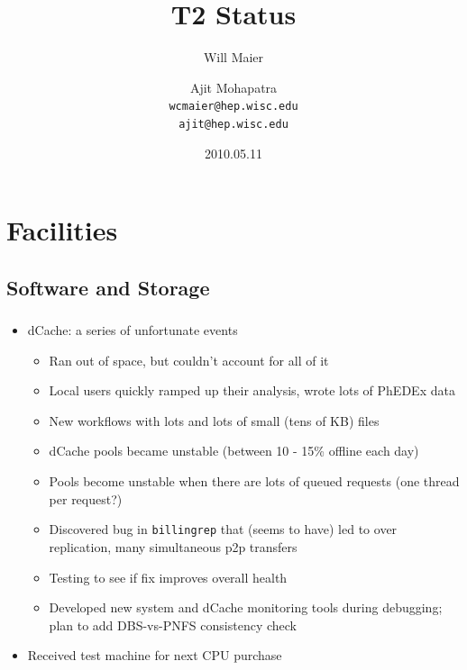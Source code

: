 \documentclass{beamer}
\title{T2 Status}
\author[Maier, Mohapatra]{
    Will Maier \and Ajit Mohapatra\\
    {\tt wcmaier@hep.wisc.edu}\\
    {\tt ajit@hep.wisc.edu}}
\institute[Wisconsin]{University of Wisconsin - High Energy Physics}
\date{2010.05.11}
\begin{document}
\begin{frame}
    \titlepage
\end{frame}


\section{Facilities}
\subsection{Software and Storage}
\begin{frame}
\frametitle{}

\begin{itemize}
	\item dCache: a series of unfortunate events
	\begin{itemize}
		\item Ran out of space, but couldn't account for all of it
		\item Local users quickly ramped up their analysis, wrote lots of PhEDEx data
		\item New workflows with lots and lots of small (tens of KB) files
		\item dCache pools became unstable (between 10 - 15\% offline each day)
		\item Pools become unstable when there are lots of queued requests (one thread per request?)
		\item Discovered bug in {\tt billingrep} that (seems to have) led to over replication, many simultaneous p2p transfers
		\item Testing to see if fix improves overall health
		\item Developed new system and dCache monitoring tools during debugging; plan to add DBS-vs-PNFS consistency check
	\end{itemize}
	\item Received test machine for next CPU purchase
\end{itemize}
\end{frame}
\end{document}
